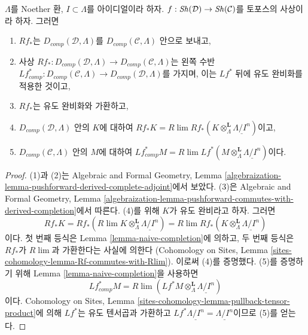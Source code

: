 \begin{lemma}
\label{lemma-pushforward-Noetherian-case}
$\Lambda$를 Noether 환, $I \subset \Lambda$를 아이디얼이라 하자.
$f : \mathop{\mathit{Sh}}\nolimits(\mathcal{D}) \to \mathop{\mathit{Sh}}\nolimits(\mathcal{C})$를 토포스의 사상이라 하자.
그러면
\begin{enumerate}
\item $Rf_*$는 $D_{comp}(\mathcal{D}, \Lambda)$를
$D_{comp}(\mathcal{C}, \Lambda)$ 안으로 보내고,
\item 사상 $Rf_* : D_{comp}(\mathcal{D}, \Lambda) \to
D_{comp}(\mathcal{C}, \Lambda)$는 왼쪽 수반
$Lf_{comp}^* : D_{comp}(\mathcal{C}, \Lambda) \to
D_{comp}(\mathcal{D}, \Lambda)$를 가지며, 이는 $Lf^*$ 뒤에 유도
완비화를 적용한 것이고,
\item $Rf_*$는 유도 완비화와 가환하고,
\item $D_{comp}(\mathcal{D}, \Lambda)$ 안의 $K$에 대하여
$Rf_*K = R\lim Rf_*(K \otimes^\mathbf{L}_\Lambda
\underline{\Lambda/I^n})$이고,
\item $D_{comp}(\mathcal{C}, \Lambda)$ 안의 $M$에 대하여
$Lf^*_{comp}M =
R\lim Lf^*(M \otimes^\mathbf{L}_\Lambda \underline{\Lambda/I^n})$이다.
\end{enumerate}
\end{lemma}

\begin{proof}
(1)과 (2)는 Algebraic and Formal Geometry, Lemma
\ref{algebraization-lemma-pushforward-derived-complete-adjoint}에서
보았다. (3)은 Algebraic and Formal Geometry, Lemma
\ref{algebraization-lemma-pushforward-commutes-with-derived-completion}에서
따른다. (4)를 위해 $K$가 유도 완비라고 하자. 그러면
$$
Rf_*K = Rf_*( R\lim K \otimes^\mathbf{L}_\Lambda \underline{\Lambda/I^n}) =
R\lim Rf_*(K \otimes^\mathbf{L}_\Lambda \underline{\Lambda/I^n})
$$
이다. 첫 번째 등식은 Lemma \ref{lemma-naive-completion}에 의하고,
두 번째 등식은 $Rf_*$가 $R\lim$과 가환한다는 사실에 의한다
(Cohomology on Sites, Lemma
\ref{sites-cohomology-lemma-Rf-commutes-with-Rlim}). 이로써 (4)를
증명했다. (5)를 증명하기 위해 Lemma \ref{lemma-naive-completion}을
사용하면
$$
Lf_{comp}^*M =
R\lim ( Lf^*M \otimes_\Lambda^\mathbf{L} \underline{\Lambda/I^n})
$$
이다. Cohomology on Sites, Lemma
\ref{sites-cohomology-lemma-pullback-tensor-product}에 의해 $Lf^*$는
유도 텐서곱과 가환하고
$Lf^*\underline{\Lambda/I^n} = \underline{\Lambda/I^n}$이므로 (5)를
얻는다.
\end{proof}












